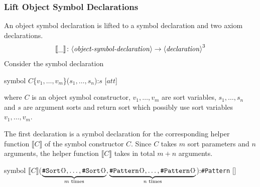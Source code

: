 \documentclass[UTF8,11pt]{article}
\theoremstyle{plain}
\theoremstyle{definition}
\theoremstyle{remark}
\newcommand{\parametric}[2]{{#1}\raisebox{.2ex}{\texttt{\footnotesize{\{}}}#2\raisebox{.2ex}{\texttt{\footnotesize{\}}}}}
\newcommand{\denote}[1]{\llbracket{#1}\rrbracket}
\newcommand{\sharpsymbol}{\#}
\newcommand{\KSort}{\texttt{\sharpsymbol Sort}}
\newcommand{\KPattern}{\texttt{\sharpsymbol Pattern}}
\newcommand{\att}{\mathit{att}}
\newcommand{\syntacc}[1]{\text{$\langle$\textit{#1}$\rangle$}}
\begin{document}
\subsubsection{Lift Object Symbol Declarations}
An object symbol declaration is lifted to a symbol declaration and two axiom 
declarations.
$$ \denote{\_} \colon \syntacc{object-symbol-declaration} \to 
\syntacc{declaration}^3$$
Consider the symbol declaration
\begin{center}
\ttfamily
symbol $C$\{$v_1,\dots,v_m$\}($s_1,\dots,s_n$):$s$ [$\att$]
\end{center}
where $C$ is an object symbol constructor, $v_1,\dots,v_m$ are sort variables, 
$s_1,\dots,s_n$ and $s$ are argument sorts and return sort which possibly use 
sort variables $v_1,\dots,v_m$.

The first declaration is a symbol declaration for the corresponding helper 
function $\denote{C}$ of the symbol constructor $C$.
Since $C$ takes $m$ sort parameters and $n$ arguments, the helper function 
$\denote{C}$ takes in total $m+n$ arguments.
\begin{center}
	\ttfamily
	symbol $\denote{C}$($\underbrace{\parametric{
			\KSort}{},\dots,\parametric{\KSort}{}}_\textrm{$m$ 
		times},\underbrace{\parametric{
			\KPattern}{},\dots,\parametric{\KPattern}{}}_\textrm{$n$ 
		times}$):\parametric{\KPattern}{} []
\end{center}
\end{document}
